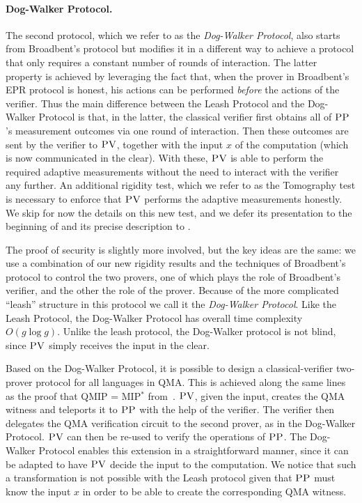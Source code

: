 \documentclass{toc}
\newcommand{\pv}{\textsc{PV}}
\newcommand{\pp}{\textsc{PP}}
\begin{document}
\paragraph{Dog-Walker Protocol.}
The second protocol, which we refer to as the \emph{Dog-Walker Protocol}, also starts from Broadbent's protocol but modifies it in a
different way to achieve a protocol that only requires a constant number of rounds of
interaction. 
The latter property is achieved by leveraging the fact that, when the prover in Broadbent's EPR protocol is honest, his actions can be performed \emph{before} the actions of the verifier.
Thus the main difference between the Leash Protocol and the Dog-Walker Protocol is that, in the latter, the classical verifier first obtains all of $\pp$'s measurement outcomes via one round of interaction. Then these outcomes are sent by the verifier to $\pv$, together with the input $x$ of the computation (which is now communicated in the clear). With these, $\pv$ is able to perform the required adaptive measurements without the need to interact with the verifier any further. An additional rigidity test, which we refer to as the Tomography test is necessary to enforce that $\pv$ performs the adaptive measurements honestly. We skip for now the details on this new test, and we defer its presentation to the beginning of  and its precise description to .

The proof of security is slightly more involved, but the key ideas are the same: we use a combination of our new rigidity results and the techniques of Broadbent's protocol to control the two provers, one of which plays the role of Broadbent's verifier, and the other the role of the prover. Because of the more complicated ``leash'' structure in this protocol we call it the \emph{Dog-Walker Protocol}. 
 Like the Leash Protocol, the Dog-Walker Protocol has overall time complexity $O(g\log g)$. Unlike the leash protocol, the Dog-Walker protocol is not blind, since $\pv$ simply receives the input in the clear.



Based on the Dog-Walker Protocol, it is possible to design a classical-verifier  two-prover protocol for all languages in QMA. This is achieved along the same lines as the proof that QMIP = MIP$^*$ from~\cite{reichardt2012classical}. $\pv$, given the input, creates the QMA witness and teleports it to $\pp$ with the help of the verifier. The verifier then delegates the QMA verification circuit to the second prover, as in the Dog-Walker Protocol. $\pv$ can then be re-used to verify the operations of $\pp$. The Dog-Walker Protocol enables this extension in a straightforward manner, since it can be adapted to have $\pv$ decide the input to the computation. We notice that such a transformation is not possible with the Leash protocol given that $\pp$ must know the input $x$ in order to be able to create the corresponding QMA witness.
\end{document}

